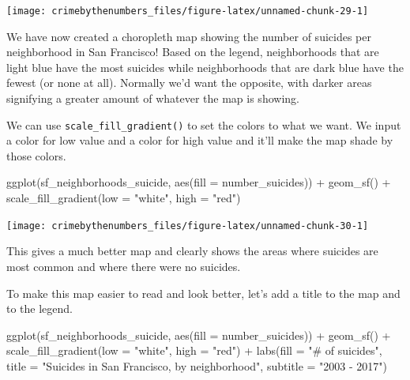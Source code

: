 \documentclass[
  12pt,
  openany]{book}
\newenvironment{Shaded}{\begin{snugshade}}{\end{snugshade}}
\newcommand{\AttributeTok}[1]{\textcolor[rgb]{0.61,0.61,0.61}{#1}}
\newcommand{\FunctionTok}[1]{\textcolor[rgb]{0,0,0}{#1}}
\newcommand{\NormalTok}[1]{#1}
\newcommand{\SpecialCharTok}[1]{\textcolor[rgb]{0,0,0}{#1}}
\newcommand{\StringTok}[1]{\textcolor[rgb]{0.5,0.5,0.5}{#1}}
\begin{document}
\begin{center}\texttt{[image: crimebythenumbers\_files/figure-latex/unnamed-chunk-29-1]} \end{center}

We have now created a choropleth map showing the number of suicides per neighborhood in San Francisco! Based on the legend, neighborhoods that are light blue have the most suicides while neighborhoods that are dark blue have the fewest (or none at all). Normally we'd want the opposite, with darker areas signifying a greater amount of whatever the map is showing.

We can use \texttt{scale\_fill\_gradient()} to set the colors to what we want. We input a color for low value and a color for high value and it'll make the map shade by those colors.

\begin{Shaded}
\begin{Highlighting}[]
\FunctionTok{ggplot}\NormalTok{(sf\_neighborhoods\_suicide, }\FunctionTok{aes}\NormalTok{(}\AttributeTok{fill =}\NormalTok{ number\_suicides)) }\SpecialCharTok{+}
  \FunctionTok{geom\_sf}\NormalTok{() }\SpecialCharTok{+}
  \FunctionTok{scale\_fill\_gradient}\NormalTok{(}\AttributeTok{low =} \StringTok{"white"}\NormalTok{, }\AttributeTok{high =} \StringTok{"red"}\NormalTok{) }
\end{Highlighting}
\end{Shaded}

\begin{center}\texttt{[image: crimebythenumbers\_files/figure-latex/unnamed-chunk-30-1]} \end{center}

This gives a much better map and clearly shows the areas where suicides are most common and where there were no suicides.

To make this map easier to read and look better, let's add a title to the map and to the legend.

\begin{Shaded}
\begin{Highlighting}[]
\FunctionTok{ggplot}\NormalTok{(sf\_neighborhoods\_suicide, }\FunctionTok{aes}\NormalTok{(}\AttributeTok{fill =}\NormalTok{ number\_suicides)) }\SpecialCharTok{+}
  \FunctionTok{geom\_sf}\NormalTok{() }\SpecialCharTok{+}
  \FunctionTok{scale\_fill\_gradient}\NormalTok{(}\AttributeTok{low =} \StringTok{"white"}\NormalTok{, }\AttributeTok{high =} \StringTok{"red"}\NormalTok{) }\SpecialCharTok{+}
  \FunctionTok{labs}\NormalTok{(}\AttributeTok{fill =} \StringTok{"\# of suicides"}\NormalTok{,}
       \AttributeTok{title =} \StringTok{"Suicides in San Francisco, by neighborhood"}\NormalTok{,}
       \AttributeTok{subtitle =} \StringTok{"2003 {-} 2017"}\NormalTok{) }
\end{Highlighting}
\end{Shaded}
\end{document}
